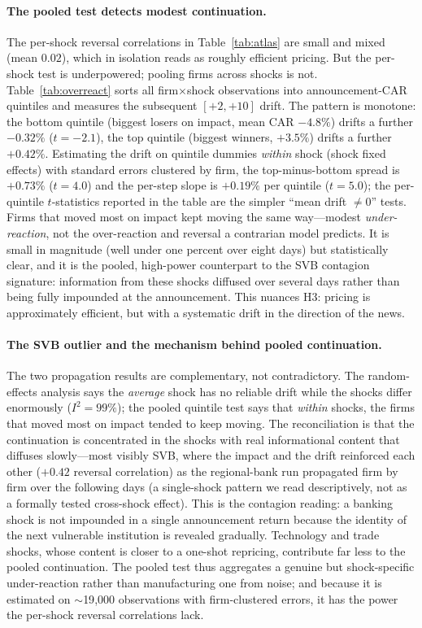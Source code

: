 \documentclass[12pt]{article}
\begin{document}
\paragraph{The pooled test detects modest continuation.} The per-shock reversal correlations in
Table~\ref{tab:atlas} are small and mixed (mean $0.02$), which in isolation reads as roughly
efficient pricing. But the per-shock test is underpowered; pooling firms across shocks is not.
Table~\ref{tab:overreact} sorts all firm$\times$shock observations into announcement-CAR quintiles
and measures the subsequent $[+2,+10]$ drift. The pattern is monotone: the bottom quintile (biggest
losers on impact, mean CAR $-4.8\%$) drifts a further $-0.32\%$ ($t=-2.1$), the top quintile
(biggest winners, $+3.5\%$) drifts a further $+0.42\%$. Estimating the drift on quintile dummies
\emph{within} shock (shock fixed effects) with standard errors clustered by firm, the top-minus-bottom
spread is $+0.73\%$ ($t=4.0$) and the per-step slope is $+0.19\%$ per quintile ($t=5.0$); the
per-quintile $t$-statistics reported in the table are the simpler ``mean drift $\neq 0$'' tests.
Firms that moved most on impact kept moving the same way---modest
\emph{under-reaction}, not the over-reaction and reversal a contrarian model predicts. It is small
in magnitude (well under one percent over eight days) but statistically clear, and it is the pooled,
high-power counterpart to the SVB contagion signature: information from these shocks diffused over
several days rather than being fully impounded at the announcement. This nuances H3: pricing is
approximately efficient, but with a systematic drift in the direction of the news.

\paragraph{The SVB outlier and the mechanism behind pooled continuation.} The two propagation results
are complementary, not contradictory. The random-effects analysis says the \emph{average} shock has
no reliable drift while the shocks differ enormously ($I^2=99\%$); the pooled quintile test says that
\emph{within} shocks, the firms that moved most on impact tended to keep moving. The reconciliation is
that the continuation is concentrated in the shocks with real informational content that diffuses
slowly---most visibly SVB, where the impact and the drift reinforced each other ($+0.42$ reversal
correlation) as the regional-bank run propagated firm by firm over the following days (a single-shock pattern we
read descriptively, not as a formally tested cross-shock effect). This is the
contagion reading: a banking shock is not impounded in a single announcement return because the
identity of the next vulnerable institution is revealed gradually. Technology and trade shocks, whose
content is closer to a one-shot repricing, contribute far less to the pooled continuation. The pooled
test thus aggregates a genuine but shock-specific under-reaction rather than manufacturing one from
noise; and because it is estimated on $\sim$19{,}000 observations with firm-clustered errors, it has
the power the per-shock reversal correlations lack.
\end{document}
